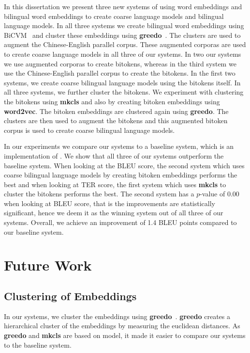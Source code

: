 In this dissertation we present three new systems of using word embeddings and bilingual word embeddings to create coarse language models and bilingual language models. In all three systems we create bilingual word embeddings using BiCVM~\cite{Hermann14} and cluster these embeddings using \textbf{greedo}~\cite{Stratos2014}. The clusters are used to augment the Chinese-English parallel corpus. These augmented corporas are used to create coarse language models in all three of our systems. In two our systems we use augmented corporas to create bitokens, whereas in the third system we use the Chinese-English parallel corpus to create the bitokens.  In the first two systems, we create coarse bilingual language models using the bitokens itself. In all three systems, we further cluster the bitokens. We experiment with clustering the bitokens using \textbf{mkcls} and also by creating bitoken embeddings using \textbf{word2vec}. The bitoken embeddings are clustered again using \textbf{greedo}. The clusters are then used to augment the bitokens and this augmented bitoken corpus is used to create coarse bilingual language models.

In our experiments we compare our systems to a baseline system, which is an implementation of \cite{Stewart2014}. We show that all three of our systems outperform the baseline system. When looking at the BLEU score, the second system which uses coarse bilingual language models by creating bitoken embeddings performs the best and when looking at TER score, the first system which uses \textbf{mkcls} to cluster the bitokens performs the best. The second system has a $p$-value of 0.00 when looking at BLEU score, that is the improvements are statistically significant, hence we deem it as the winning system out of all three of our systems. Overall, we achieve an improvement of 1.4 BLEU points compared to our baseline system.

\section{Future Work}
\subsection{Clustering of Embeddings}
In our systems, we cluster the embeddings using \textbf{greedo}~\cite{Stratos2014}. \textbf{greedo} creates a hierarchical cluster of the embeddings by measuring the euclidean distances. As \textbf{greedo} and \textbf{mkcls} are based on \cite{Brown1992} model, it made it easier to compare our systems to the baseline system. 

